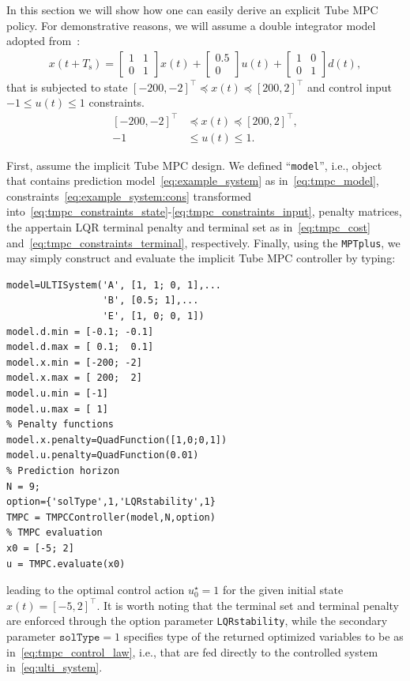 \documentclass[letterpaper, 10 pt, conference]{ieeeconf}
\begin{document}
In this section we will show how one can easily derive an explicit Tube MPC policy. For demonstrative reasons, we will assume a double integrator model adopted from~\cite{MS05}:
\begin{eqnarray}
	\label{eq:example_system}
	x(t+T_\text{s}) = 
	\begin{bmatrix}
		1 & 1 \\
		0 & 1 
	\end{bmatrix} 
	x(t) + 
	\begin{bmatrix}
		0.5 \\
		0  
	\end{bmatrix}
	u(t) + 
	\begin{bmatrix}
		1 & 0 \\
		0 & 1 
	\end{bmatrix}
	d(t) ,
\end{eqnarray}
that is subjected to state $[-200, -2]^{\top} \preceq x(t) \preceq [200, 2]^{\top}$ and control input $-1 \leq u(t) \leq 1$ constraints.
\begin{subequations}
	\label{eq:example_system:cons}
	\begin{align}
		[-200, -2]^{\top} &\preceq x(t) \preceq [200, 2]^{\top}, \\
		-1 &\leq u(t) \leq 1.
	\end{align}
\end{subequations}



First, assume the implicit Tube MPC design. We defined ``\verb|model|'', i.e., object that contains prediction model~\eqref{eq:example_system} as in~\eqref{eq:tmpc_model}, constraints~\eqref{eq:example_system:cons} transformed into~\eqref{eq:tmpc_constraints_state}-\eqref{eq:tmpc_constraints_input}, penalty matrices, the appertain LQR terminal penalty and terminal set as in~\eqref{eq:tmpc_cost} and~\eqref{eq:tmpc_constraints_terminal}, respectively. 
Finally, using the \texttt{MPTplus}, we may simply construct and evaluate the implicit Tube MPC controller by typing:
\begin{verbatim}
model=ULTISystem('A', [1, 1; 0, 1],...
                 'B', [0.5; 1],...
                 'E', [1, 0; 0, 1])
model.d.min = [-0.1; -0.1] 
model.d.max = [ 0.1;  0.1]
model.x.min = [-200; -2]
model.x.max = [ 200;  2]
model.u.min = [-1]
model.u.max = [ 1]
% Penalty functions
model.x.penalty=QuadFunction([1,0;0,1])
model.u.penalty=QuadFunction(0.01)
% Prediction horizon
N = 9;
option={'solType',1,'LQRstability',1}
TMPC = TMPCController(model,N,option)
% TMPC evaluation
x0 = [-5; 2]
u = TMPC.evaluate(x0)
\end{verbatim}
leading to the optimal control action $u_{0}^{\star} = 1$ for the given initial state $x(t) = [-5, 2]^\top$.
It is worth noting that the terminal set and terminal penalty are enforced through the option parameter \texttt{LQRstability}, while the secondary parameter $\texttt{solType} = 1$ specifies type of the returned optimized variables to be as in~\eqref{eq:tmpc_control_law}, i.e., that are fed directly to the controlled system in~\eqref{eq:ulti_system}.
\end{document}
